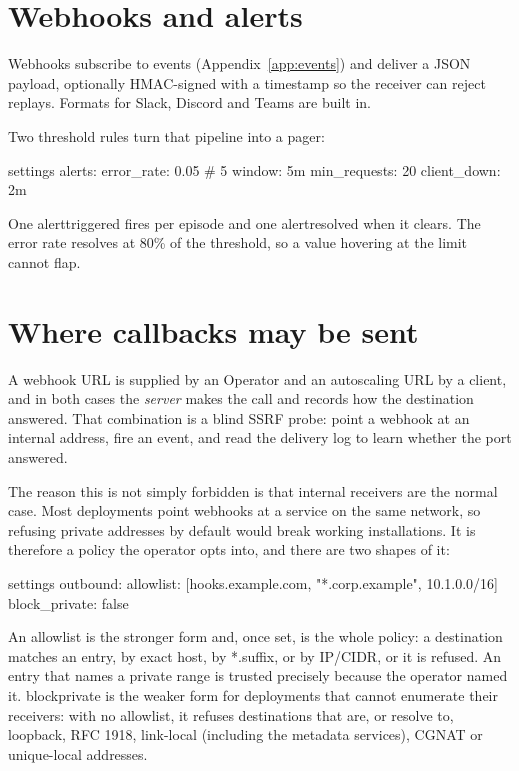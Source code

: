 \documentclass[11pt,a4paper,oneside]{book}
\newcommand{\aperiobreakableunderscore}{\textunderscore\allowbreak}
\newcommand{\aperiocodebreaks}{\XeTeXinterchartokenstate=1 }
\newcommand{\aperiocodebreaks}{}
\DeclareRobustCommand{\code}[1]{{\ttfamily\small\aperiocodebreaks
  \let\_\aperiobreakableunderscore#1}}
\begin{document}
\section{Webhooks and alerts}

Webhooks subscribe to events (Appendix~\ref{app:events}) and deliver a
JSON payload, optionally HMAC-signed with a timestamp so the receiver can
reject replays. Formats for Slack, Discord and Teams are built in.

Two threshold rules turn that pipeline into a pager:

\begin{codecard}[aperioyaml]{settings}
alerts:
  error_rate: 0.05         # 5%
  window: 5m
  min_requests: 20
  client_down: 2m
\end{codecard}

One \code{alert\_triggered} fires per episode and one
\code{alert\_resolved} when it clears. The error rate resolves at 80\% of
the threshold, so a value hovering at the limit cannot flap.

\section{Where callbacks may be sent}
\label{sec:outbound-policy}

A webhook URL is supplied by an Operator and an autoscaling URL by a
client, and in both cases the \emph{server} makes the call and records how
the destination answered. That combination is a blind SSRF probe: point a
webhook at an internal address, fire an event, and read the delivery log
to learn whether the port answered.

The reason this is not simply forbidden is that internal receivers are the
normal case. Most deployments point webhooks at a service on the same
network, so refusing private addresses by default would break working
installations. It is therefore a policy the operator opts into, and there
are two shapes of it:

\begin{codecard}[aperioyaml]{settings}
outbound:
  allowlist: [hooks.example.com, "*.corp.example", 10.1.0.0/16]
  block_private: false
\end{codecard}

An allowlist is the stronger form and, once set, is the whole policy: a
destination matches an entry, by exact host, by \code{*.suffix}, or by
IP/CIDR, or it is refused. An entry that names a private range is trusted
precisely because the operator named it. \code{block\_private} is the
weaker form for deployments that cannot enumerate their receivers: with no
allowlist, it refuses destinations that are, or resolve to, loopback,
RFC 1918, link-local (including the metadata services), CGNAT or
unique-local addresses.
\end{document}
